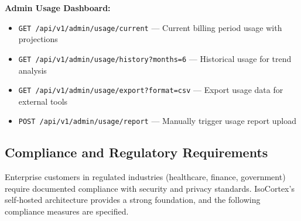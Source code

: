 \documentclass[11pt,a4paper]{article}
\newcommand{\inlinecode}[1]{\texttt{\small\colorbox{ctCodeBg}{#1}}}
\begin{document}
\begin{reqbox}
\textbf{Admin Usage Dashboard:}
\begin{itemize}
    \item \inlinecode{GET /api/v1/admin/usage/current} --- Current billing period usage with projections
    \item \inlinecode{GET /api/v1/admin/usage/history?months=6} --- Historical usage for trend analysis
    \item \inlinecode{GET /api/v1/admin/usage/export?format=csv} --- Export usage data for external tools
    \item \inlinecode{POST /api/v1/admin/usage/report} --- Manually trigger usage report upload
\end{itemize}
\end{reqbox}

\subsection{Compliance and Regulatory Requirements}

Enterprise customers in regulated industries (healthcare, finance, government) require documented compliance with security and privacy standards. IsoCortex's self-hosted architecture provides a strong foundation, and the following compliance measures are specified.
\end{document}
